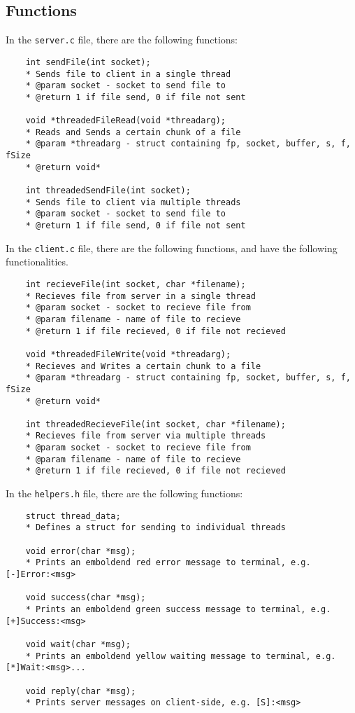 \documentclass{article}
\begin{document}
\subsection{Functions}
In the \texttt{server.c} file, there are the following functions:
\begin{verbatim}
    int sendFile(int socket);
    * Sends file to client in a single thread
    * @param socket - socket to send file to
    * @return 1 if file send, 0 if file not sent

    void *threadedFileRead(void *threadarg);
    * Reads and Sends a certain chunk of a file
    * @param *threadarg - struct containing fp, socket, buffer, s, f, fSize
    * @return void*

    int threadedSendFile(int socket);
    * Sends file to client via multiple threads
    * @param socket - socket to send file to
    * @return 1 if file send, 0 if file not sent
\end{verbatim}
In the \texttt{client.c} file, there are the following functions, and have the following functionalities.
\begin{verbatim}
    int recieveFile(int socket, char *filename);
    * Recieves file from server in a single thread
    * @param socket - socket to recieve file from
    * @param filename - name of file to recieve
    * @return 1 if file recieved, 0 if file not recieved
    
    void *threadedFileWrite(void *threadarg);
    * Recieves and Writes a certain chunk to a file
    * @param *threadarg - struct containing fp, socket, buffer, s, f, fSize
    * @return void*
    
    int threadedRecieveFile(int socket, char *filename);
    * Recieves file from server via multiple threads
    * @param socket - socket to recieve file from
    * @param filename - name of file to recieve
    * @return 1 if file recieved, 0 if file not recieved
\end{verbatim}
In the \texttt{helpers.h} file, there are the following functions:
\begin{verbatim}
    struct thread_data;
    * Defines a struct for sending to individual threads
    
    void error(char *msg);
    * Prints an emboldend red error message to terminal, e.g. [-]Error:<msg>
    
    void success(char *msg);
    * Prints an emboldend green success message to terminal, e.g. [+]Success:<msg>
    
    void wait(char *msg);
    * Prints an emboldend yellow waiting message to terminal, e.g. [*]Wait:<msg>...
    
    void reply(char *msg);
    * Prints server messages on client-side, e.g. [S]:<msg>
\end{verbatim}
\newpage
\end{document}

